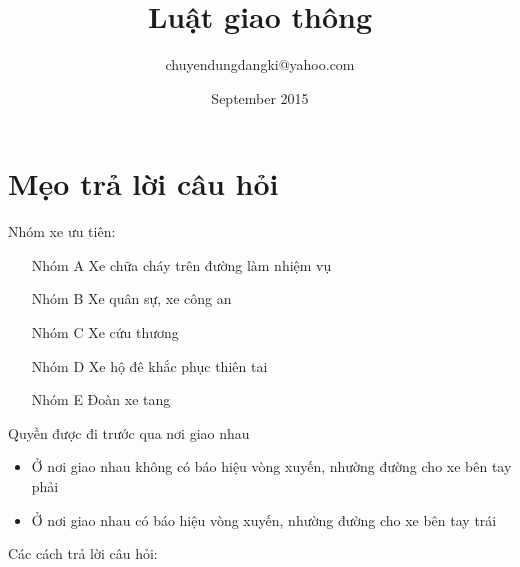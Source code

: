 \documentclass{article}
\title{Luật giao thông}
\author{chuyendungdangki@yahoo.com}
\date{September 2015}
\begin{document}
\noindent
\parindent0pt
\maketitle

\section{Mẹo trả lời câu hỏi}

Nhóm xe ưu tiên: 

\begin{itemize}
\item[Nhóm A] Xe chữa cháy trên đường làm nhiệm vụ
\item[Nhóm B] Xe quân sự, xe công an
\item[Nhóm C] Xe cứu thương
\item[Nhóm D] Xe hộ đê khắc phục thiên tai
\item[Nhóm E] Đoàn xe tang
\end{itemize}

Quyền được đi trước qua nơi giao nhau

\begin{itemize}
\item Ở nơi giao nhau không có báo hiệu vòng xuyến, nhường đường cho xe bên tay phải
\item Ở nơi giao nhau có báo hiệu vòng xuyến, nhường đường cho xe bên tay trái
\end{itemize}

Các cách trả lời câu hỏi:
\end{document}

